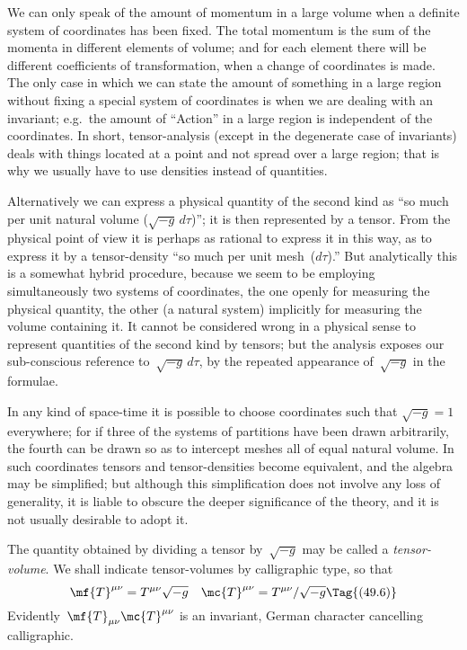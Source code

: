 \documentclass[12pt]{book}
\begin{document}
We can only speak of the amount of momentum in a large volume when
a definite system of coordinates has been fixed. The total momentum is the
sum of the momenta in different elements of volume; and for each element
there will be different coefficients of transformation, when a change of coordinates
is made. The only case in which we can state the amount of something
in a large region without fixing a special system of coordinates is when we
are dealing with an invariant; e.g.\ the amount of ``Action'' in a large region
is independent of the coordinates. In short, tensor\hyp{}analysis (except in the
degenerate case of invariants) deals with things located at a point and not
spread over a large region; that is why we usually have to use densities
instead of quantities.

Alternatively we can express a physical quantity of the second kind as
``so much per unit natural volume ($\sqrt{-g}\, d\tau$)''; it is then represented by a
tensor. From the physical point of view it is perhaps as rational to express
it in this way, as to express it by a tensor\hyp{}density ``so much per unit mesh~($d\tau$).''
But analytically this is a somewhat hybrid procedure, because we seem
to be employing simultaneously two systems of coordinates, the one openly
for measuring the physical quantity, the other (a natural system) implicitly
for measuring the volume containing it. It cannot be considered wrong in a
physical sense to represent quantities of the second kind by tensors; but the
analysis exposes our sub\hyp{}conscious reference to~$\sqrt{-g}\, d\tau$, by the repeated
appearance of~$\sqrt{-g}$ in the formulae.

In any kind of space-time it is possible to choose coordinates such that
$\sqrt{-g} = 1$ everywhere; for if three of the systems of partitions have been
drawn arbitrarily, the fourth can be drawn so as to intercept meshes all of
equal natural volume. In such coordinates tensors and tensor\hyp{}densities become
equivalent, and the algebra may be simplified; but although this simplification
does not involve any loss of generality, it is liable to obscure the deeper
significance of the theory, and it is not usually desirable to adopt it.

The quantity obtained by dividing a tensor by~$\sqrt{-g}$ may be called a \emph{tensor\hyp{}volume}.
We shall indicate tensor\hyp{}volumes by calligraphic type, so that
\[
\mf{T}^{\mu\nu} = T^{\mu\nu}\sqrt{-g} \quad \mc{T}^{\mu\nu} = T^{\mu\nu}/\sqrt{-g}
\Tag{(49.6)}
\]
Evidently~$\mf{T}_{\mu\nu}\mc{T}^{\mu\nu}$ is an invariant, German character cancelling calligraphic.
\end{document}
